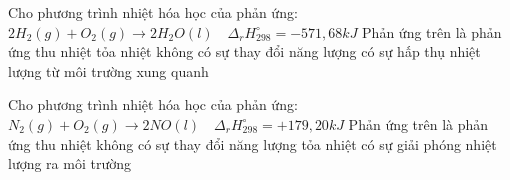 \documentclass[Main.tex]{subfiles}
\begin{document}
	\begin{ex}
		 Cho phương trình nhiệt hóa học của phản ứng:
		$2H_2(g) + O_2(g) \longrightarrow 2H_2O(l) \quad \Delta_r H_{298}^{\circ} = -571{,}68 kJ$
		Phản ứng trên là phản ứng
		{thu nhiệt}
		{\True tỏa nhiệt}
		{không có sự thay đổi năng lượng}
		{có sự hấp thụ nhiệt lượng từ môi trường xung quanh}
	\end{ex}
	
	\begin{ex}
		 Cho phương trình nhiệt hóa học của phản ứng:
		$N_2(g) + O_2(g) \longrightarrow 2NO(l) \quad \Delta_r H_{298}^{\circ} = +179{,}20 kJ$
		Phản ứng trên là phản ứng
		{\True thu nhiệt}
		{không có sự thay đổi năng lượng}
		{tỏa nhiệt}
		{có sự giải phóng nhiệt lượng ra môi trường}
	\end{ex}
	
\end{document}
